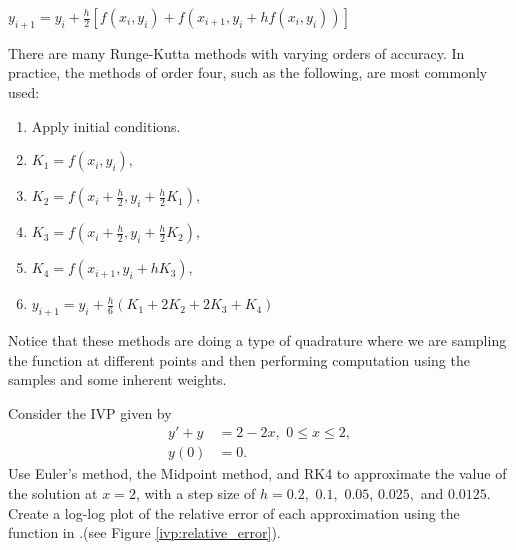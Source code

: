 $y_{i+1} = y_i + \frac{h}{2}[ f(x_i, y_i) + f(x_{i+1}, y_i+ hf(x_i, y_i))]$

There are many Runge-Kutta methods with varying orders of accuracy. In practice, the methods of order four, such as the following, are most commonly used:
\begin{enumerate}
\item Apply initial conditions.
\item $K_1 = f(x_i,y_i),$
\item $K_2 = f(x_i + \frac{h}{2}, y_i + \frac{h}{2} K_1),$
\item $K_3 = f(x_i + \frac{h}{2} , y_i + \frac{h}{2} K_2),$
\item $K_4 = f(x_{i+1} , y_i + h K_3),$
\item $y_{i+1} = y_i + \frac{h}{6}(K_1 + 2K_2 + 2K_3 + K_4)$
\end{enumerate}

Notice that these methods are doing a type of quadrature where we are sampling the function at different points and then performing computation using the samples and some inherent weights.

\begin{problem} Consider the IVP given by
\begin{align*}
y' + y &= 2-2x,\,\, 0 \leq x \leq 2, \\
y(0) &= 0.
\end{align*}
Use Euler's method, the Midpoint method, and RK4 to approximate the value of the solution at $x = 2$, with a step size of $h = 0.2,$ $ 0.1,$ $0.05 $, $0.025,$ and $0.0125.$ Create a log-log plot of the relative error of each approximation using the  function in .(see Figure \ref{ivp:relative_error}).
\end{problem}


